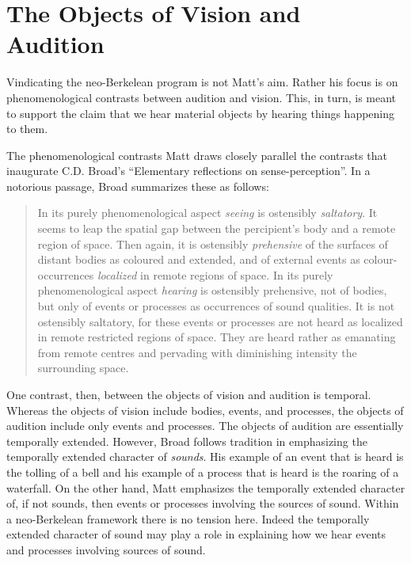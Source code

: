 \documentclass[12pt]{article}
\begin{document}

\section{The Objects of Vision and Audition} %
\label{sec:the_objects_of_vision_and_audition}

Vindicating the neo-Berkelean program is not Matt's aim. Rather his focus is on phenomenological contrasts between audition and vision. This, in turn, is meant to support the claim that we hear material objects by hearing things happening to them.

The phenomenological contrasts Matt draws closely parallel the contrasts that inaugurate C.D. Broad's \citeyearpar{Broad:1965dq} ``Elementary reflections on sense-perception''. %
In a notorious passage, Broad summarizes these as follows:
\begin{quote}
	In its purely phenomenological aspect \emph{seeing} is ostensibly \emph{saltatory}. It seems to leap the spatial gap between the percipient's body and a remote region of space. Then again, it is ostensibly \emph{prehensive} of the surfaces of distant bodies as coloured and extended, and of external events as colour-occurrences \emph{localized} in remote regions of space. In its purely phenomenological aspect \emph{hearing} is ostensibly prehensive, not of bodies, but only of events or processes as occurrences of sound qualities. It is not ostensibly saltatory, for these events or processes are not heard as localized in remote restricted regions of space. They are heard rather as emanating from remote centres and pervading with diminishing intensity the surrounding space. \citep[32]{Broad:1965dq}
\end{quote}

One contrast, then, between the objects of vision and audition is temporal. Whe\-re\-as the objects of vision include bodies, events, and processes, the objects of audition include only events and processes. The objects of audition are essentially temporally extended. However, Broad follows tradition in emphasizing the temporally extended character of \emph{sounds}. His example of an event that is heard is the tolling of a bell and his example of a process that is heard is the roaring of a waterfall. On the other hand, Matt emphasizes the temporally extended character of, if not sounds, then events or processes involving the sources of sound. Within a neo-Berkelean framework there is no tension here. Indeed the temporally extended character of sound may play a role in explaining how we hear events and processes involving sources of sound. 
\end{document}
